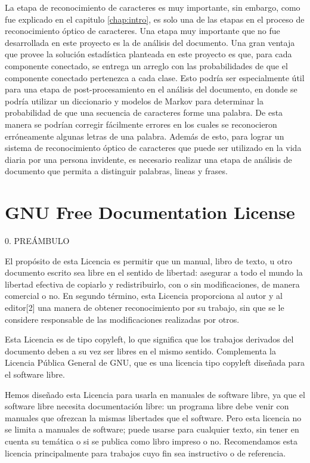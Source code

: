 \documentclass[a4paper, 11pt, oneside]{report}
\begin{document}
La etapa de reconocimiento de caracteres es muy importante, sin embargo, como fue explicado en el capitulo \ref{chap:intro}, es solo una de las etapas en el proceso de reconocimiento óptico de caracteres. Una etapa muy importante que no fue desarrollada en este proyecto es la de análisis del documento. Una gran ventaja que provee la solución estadística planteada en este proyecto es que, para cada componente conectado, se entrega un arreglo con las probabilidades de que el componente conectado pertenezca a cada clase. Esto podría ser especialmente útil para una etapa de post-procesamiento en el análisis del documento, en donde se podría utilizar un diccionario y modelos de Markov para determinar la probabilidad de que una secuencia de caracteres forme una palabra. De esta manera se podrían corregir fácilmente errores en los cuales se reconocieron erróneamente algunas letras de una palabra. Además de esto, para lograr un sistema de reconocimiento óptico de caracteres que puede ser utilizado en la vida diaria por una persona invidente, es necesario realizar una etapa de análisis de documento que permita a distinguir palabras, lineas y frases.


\chapter{GNU Free Documentation License}

0. PREÁMBULO

El propósito de esta Licencia es permitir que un manual, libro de texto, u otro documento escrito sea libre en el sentido de libertad: asegurar a todo el mundo la libertad efectiva de copiarlo y redistribuirlo, con o sin modificaciones, de manera comercial o no. En segundo término, esta Licencia proporciona al autor y al editor[2] una manera de obtener reconocimiento por su trabajo, sin que se le considere responsable de las modificaciones realizadas por otros.

Esta Licencia es de tipo copyleft, lo que significa que los trabajos derivados del documento deben a su vez ser libres en el mismo sentido. Complementa la Licencia Pública General de GNU, que es una licencia tipo copyleft diseñada para el software libre.

Hemos diseñado esta Licencia para usarla en manuales de software libre, ya que el software libre necesita documentación libre: un programa libre debe venir con manuales que ofrezcan la mismas libertades que el software. Pero esta licencia no se limita a manuales de software; puede usarse para cualquier texto, sin tener en cuenta su temática o si se publica como libro impreso o no. Recomendamos esta licencia principalmente para trabajos cuyo fin sea instructivo o de referencia.
\end{document}
